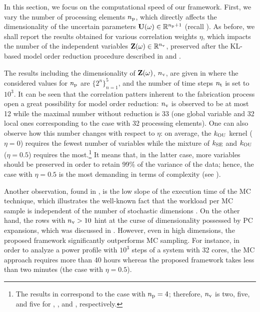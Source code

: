 In this section, we focus on the computational speed of our framework.
First, we vary the number of processing elements ${n_\text{p}}$, which directly affects the dimensionality of the uncertain parameters $\mathbf{U}(\omega) \in \mathbb{R}^{{n_\text{p}} + 1}$ (recall ).
As before, we shall report the results obtained for various correlation weights $\eta$, which impacts the number of the independent variables $\mathbf{Z}(\omega) \in \mathbb{R}^{n_\text{v}}$, preserved after the KL-based model order reduction procedure described in  and .

The results including the dimensionality of $\mathbf{Z}(\omega)$, ${n_\text{v}}$, are given in  where the considered values for ${n_\text{p}}$ are $\{ 2^n \}_{n = 1}^5$, and the number of time steps ${n_\text{t}}$ is set to $10^3$.
It can be seen that the correlation patters inherent to the fabrication process \cite{cheng2011} open a great possibility for model order reduction: ${n_\text{v}}$ is observed to be at most 12 while the maximal number without reduction is 33 (one global variable and 32 local ones corresponding to the case with 32 processing elements).
One can also observe how this number changes with respect to $\eta$: on average, the $\fCorr_\OU$ kernel ($\eta = 0$) requires the fewest number of variables while the mixture of $\fCorr_\SE$ and $\fCorr_\OU$ ($\eta = 0.5$) requires the most.\footnote{The results in  correspond to the case with ${n_\text{p}} = 4$; therefore, ${n_\text{v}}$ is two, five, and five for , , and , respectively.}
It means that, in the latter case, more variables should be preserved in order to retain 99\% of the variance of the data; hence, the case with $\eta = 0.5$ is the most demanding in terms of complexity (see ).

Another observation, found in , is the low slope of the execution time of the MC technique, which illustrates the well-known fact that the workload per MC sample is independent of the number of stochastic dimensions \cite{maitre2010}.
On the other hand, the rows with ${n_\text{v}} > 10$ hint at the curse of dimensionality possessed by PC expansions, which was discussed in .
However, even in high dimensions, the proposed framework significantly outperforms MC sampling. For instance, in order to analyze a power profile with $10^3$ steps of a system with 32 cores, the MC approach requires more than 40 hours whereas the proposed framework takes less than two minutes (the case with $\eta = 0.5$).

